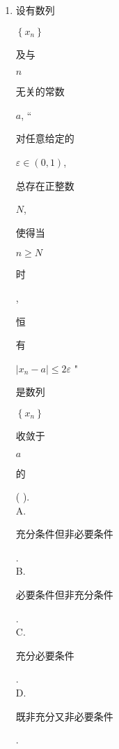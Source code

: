 \documentclass[10pt]{article}
\begin{document}
\begin{enumerate}
  \item \begin{CJK}{UTF8}{mj}设有数列\end{CJK} $\left\{x_{n}\right\}$ \begin{CJK}{UTF8}{mj}及与\end{CJK} $n$ \begin{CJK}{UTF8}{mj}无关的常数\end{CJK} $a$, “\begin{CJK}{UTF8}{mj}对任意给定的\end{CJK} $\varepsilon \in(0,1)$, \begin{CJK}{UTF8}{mj}总存在正整数\end{CJK} $N$, \begin{CJK}{UTF8}{mj}使得当\end{CJK} $n \geqslant N$ \begin{CJK}{UTF8}{mj}时\end{CJK}, \begin{CJK}{UTF8}{mj}恒\end{CJK} \begin{CJK}{UTF8}{mj}有\end{CJK} $\left|x_{n}-a\right| \leqslant 2 \varepsilon$ " \begin{CJK}{UTF8}{mj}是数列\end{CJK} $\left\{x_{n}\right\}$ \begin{CJK}{UTF8}{mj}收敛于\end{CJK} $a$ \begin{CJK}{UTF8}{mj}的\end{CJK} ( ).\\
A. \begin{CJK}{UTF8}{mj}充分条件但非必要条件\end{CJK}.\\
B. \begin{CJK}{UTF8}{mj}必要条件但非充分条件\end{CJK}.\\
C. \begin{CJK}{UTF8}{mj}充分必要条件\end{CJK}.\\
D. \begin{CJK}{UTF8}{mj}既非充分又非必要条件\end{CJK}.


\end{enumerate}
\end{document}
